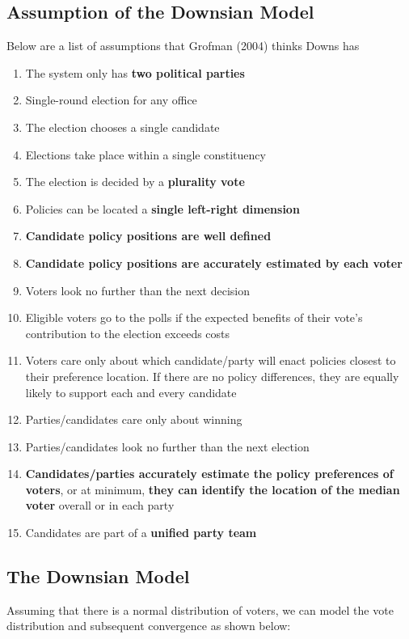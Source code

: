 \documentclass[12pt, letterpaper]{article}
\begin{document}
\subsection{Assumption of the Downsian Model}
Below are a list of assumptions that Grofman (2004) thinks Downs has
\begin{enumerate}
	\item The system only has \textbf{two political parties}
	\item Single-round election for any office
	\item The election chooses a single candidate
	\item Elections take place within a single constituency
	\item The election is decided by a \textbf{plurality vote}
	\item Policies can be located a \textbf{single left-right dimension}
	\item \textbf{Candidate policy positions are well defined}
	\item \textbf{Candidate policy positions are accurately estimated by each voter}
	\item Voters look no further than the next decision
	\item Eligible voters go to the polls if the expected benefits of their vote's contribution to the election exceeds costs
	\item Voters care only about which candidate/party will enact policies closest to their preference location. If there are no policy differences, they are equally likely to support each and every candidate
	\item Parties/candidates care only about winning
	\item Parties/candidates look no further than the next election
	\item \textbf{Candidates/parties accurately estimate the policy preferences of voters}, or at minimum,\textbf{ they can identify the location of the median voter} overall or in each party
	\item Candidates are part of a \textbf{unified party team}
\end{enumerate}

\subsection{The Downsian Model}
Assuming that there is a normal distribution of voters, we can model the vote distribution and subsequent convergence as shown below:
\begin{center}
\end{center}
\end{document}
